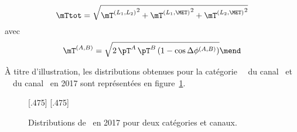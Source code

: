 \begin{equation}
\mTtot = \sqrt{{\mT^{(L_1,L_2)}}^2 + {\mT^{(L_1,\MET)}}^2 + {\mT^{(L_2,\MET)}}^{2}}
\label{eq-def_mTtot}
\end{equation}
avec
\begin{equation}
\mT^{(A,B)} = \sqrt{2 \, \pT^{A} \, \pT^{B} \, (1-\cos\Delta\phi^{(A,B)})}
\mend
\end{equation}
\par
À titre d'illustration, les distributions obtenues pour la catégorie \CATbtag\ \CATtightmt\ du canal \mu\tauh\ et \CATbtag\ \CATmediumdz\ du canal \ele\mu\ en 2017 sont représentées en figure~\ref{fig-mTtot_distribs_exemple}.
\begin{figure}[h]
\centering

[.475\textwidth]
{}
\hfill
{}[.475\textwidth]
{}

\caption[Distributions de \mTtot\ en 2017 pour deux catégories et canaux.]{Distributions de \mTtot\ en 2017 pour deux catégories et canaux.}
\label{fig-mTtot_distribs_exemple}
\end{figure}
